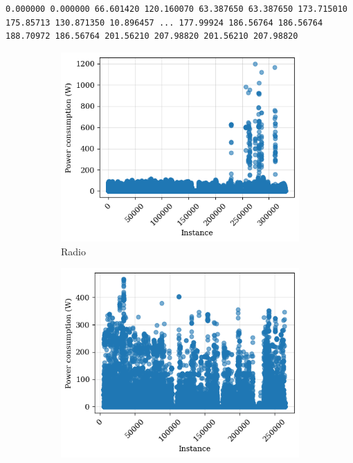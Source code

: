 \begin{lstlisting}[language=plain,caption={Example of an activation for the fridge},label=lst:activation_example,float,floatplacement=H]
0.000000 0.000000 66.601420 120.160070 63.387650 63.387650 173.715010 175.85713 130.871350 10.896457 ... 177.99924 186.56764 186.56764 188.70972 186.56764 201.56210 207.98820 201.56210 207.98820
\end{lstlisting}

\begin{figure}
    \begin{subfigure}{.5\textwidth}
      \centering
      \includegraphics[width=.9\linewidth]{images/raw_consumptions/audio_amplifier.png}
      \caption{Radio}
      \label{fig:radio}
    \end{subfigure}%
    \begin{subfigure}{.5\textwidth}
      \centering
      \includegraphics[width=.9\linewidth]{images/raw_consumptions/dish_washer.png}

\end{subfigure}
\end{figure}
